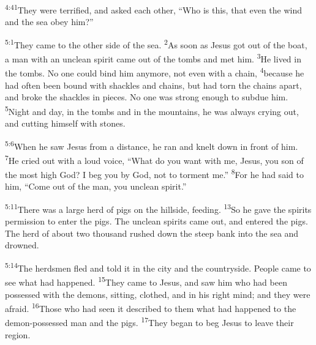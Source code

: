 \documentclass[openany,12pt,english]{book}
\newenvironment{para}{\par\pretolerance=100\tolerance=200\setlength{\emergencystretch}{0.6em}\relax}{\par}
\begin{document}
\begin{para}
    \textsuperscript{4:41}\thinspace{}They were ter\-ri\-fied, and asked each oth\-er, “Who is this, that e\-ven the wind and the sea o\-bey him?”
\end{para}

\bigskip{}

\begin{para}
    \textsuperscript{5:1}\thinspace{}They came to the oth\-er side of the sea.
    \textsuperscript{2}\thinspace{}As soon as Jesus got out of the boat, a man with an un\-clean spir\-it came out of the tombs and met him.
    \textsuperscript{3}\thinspace{}He lived in the tombs. No one could bind him any\-more, not e\-ven with a chain,
    \textsuperscript{4}\thinspace{}be\-cause he had of\-ten been bound with shackles and chains, but had torn the chains a\-part, and broke the shackles in pieces. No one was strong e\-nough to sub\-due him.
    \textsuperscript{5}\thinspace{}Night and day, in the tombs and in the mountains, he was al\-ways cry\-ing out, and cut\-ting him\-self with stones.
\end{para}

\begin{para}
    \textsuperscript{5:6}\thinspace{}When he saw Jesus from a dis\-tance, he ran and knelt down in front of him.
    \textsuperscript{7}\thinspace{}He cried out with a loud voice, “What do you want with me, Jesus, you son of the most high God? I beg you by God, not to tor\-ment me.”
    \textsuperscript{8}\thinspace{}For he had said to him, “Come out of the man, you un\-clean spir\-it.”
\end{para}

\begin{para}
    \textsuperscript{5:11}\thinspace{}There was a large herd of pigs on the hill\-side, feed\-ing.
    \textsuperscript{13}\thinspace{}So he gave the spirits per\-mis\-sion to en\-ter the pigs. The un\-clean spirits came out, and entered the pigs. The herd of a\-bout two thou\-sand rushed down the steep bank in\-to the sea and drowned.
\end{para}

\begin{para}
    \textsuperscript{5:14}\thinspace{}The herdsmen fled and told it in the cit\-y and the coun\-try\-side. Peo\-ple came to see what had happened.
    \textsuperscript{15}\thinspace{}They came to Jesus, and saw him who had been pos\-sessed with the demons, sit\-ting, clothed, and in his right mind; and they were a\-fraid.
    \textsuperscript{16}\thinspace{}Those who had seen it de\-scribed to them what had happened to the demon-possessed man and the pigs.
    \textsuperscript{17}\thinspace{}They be\-gan to beg Jesus to leave their re\-gion.
\end{para}
\end{document}
